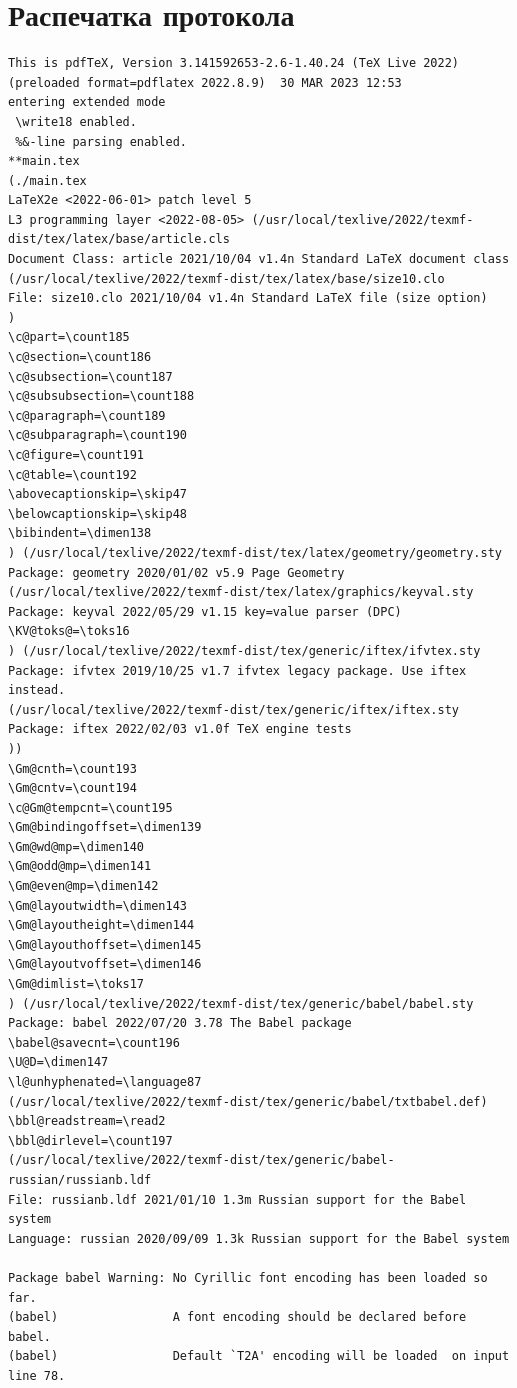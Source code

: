 \documentclass{article}
\begin{document}
\section{Распечатка протокола}
\begin{verbatim}
This is pdfTeX, Version 3.141592653-2.6-1.40.24 (TeX Live 2022) (preloaded format=pdflatex 2022.8.9)  30 MAR 2023 12:53
entering extended mode
 \write18 enabled.
 %&-line parsing enabled.
**main.tex
(./main.tex
LaTeX2e <2022-06-01> patch level 5
L3 programming layer <2022-08-05> (/usr/local/texlive/2022/texmf-dist/tex/latex/base/article.cls
Document Class: article 2021/10/04 v1.4n Standard LaTeX document class
(/usr/local/texlive/2022/texmf-dist/tex/latex/base/size10.clo
File: size10.clo 2021/10/04 v1.4n Standard LaTeX file (size option)
)
\c@part=\count185
\c@section=\count186
\c@subsection=\count187
\c@subsubsection=\count188
\c@paragraph=\count189
\c@subparagraph=\count190
\c@figure=\count191
\c@table=\count192
\abovecaptionskip=\skip47
\belowcaptionskip=\skip48
\bibindent=\dimen138
) (/usr/local/texlive/2022/texmf-dist/tex/latex/geometry/geometry.sty
Package: geometry 2020/01/02 v5.9 Page Geometry
(/usr/local/texlive/2022/texmf-dist/tex/latex/graphics/keyval.sty
Package: keyval 2022/05/29 v1.15 key=value parser (DPC)
\KV@toks@=\toks16
) (/usr/local/texlive/2022/texmf-dist/tex/generic/iftex/ifvtex.sty
Package: ifvtex 2019/10/25 v1.7 ifvtex legacy package. Use iftex instead.
(/usr/local/texlive/2022/texmf-dist/tex/generic/iftex/iftex.sty
Package: iftex 2022/02/03 v1.0f TeX engine tests
))
\Gm@cnth=\count193
\Gm@cntv=\count194
\c@Gm@tempcnt=\count195
\Gm@bindingoffset=\dimen139
\Gm@wd@mp=\dimen140
\Gm@odd@mp=\dimen141
\Gm@even@mp=\dimen142
\Gm@layoutwidth=\dimen143
\Gm@layoutheight=\dimen144
\Gm@layouthoffset=\dimen145
\Gm@layoutvoffset=\dimen146
\Gm@dimlist=\toks17
) (/usr/local/texlive/2022/texmf-dist/tex/generic/babel/babel.sty
Package: babel 2022/07/20 3.78 The Babel package
\babel@savecnt=\count196
\U@D=\dimen147
\l@unhyphenated=\language87
(/usr/local/texlive/2022/texmf-dist/tex/generic/babel/txtbabel.def)
\bbl@readstream=\read2
\bbl@dirlevel=\count197
(/usr/local/texlive/2022/texmf-dist/tex/generic/babel-russian/russianb.ldf
File: russianb.ldf 2021/01/10 1.3m Russian support for the Babel system
Language: russian 2020/09/09 1.3k Russian support for the Babel system

Package babel Warning: No Cyrillic font encoding has been loaded so far.
(babel)                A font encoding should be declared before babel.
(babel)                Default `T2A' encoding will be loaded  on input line 78.


\end{verbatim}
\end{document}
